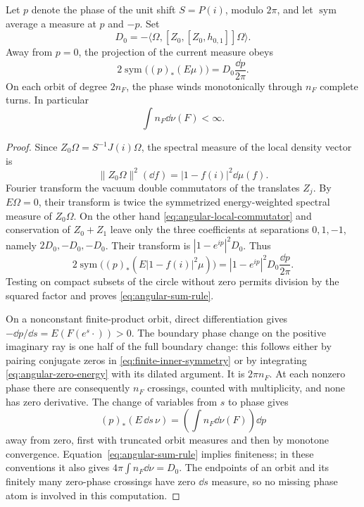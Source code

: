 \begin{lemma}\label{lem:sum-rule}
Let $p$ denote the phase of the unit shift $S=P(i)$, modulo $2\pi$, and
let $\operatorname{sym}$ average a measure at $p$ and $-p$.  Set
\[
 D_0=-\langle\Omega,[Z_0,[Z_0,h_{0,1}]]\Omega\rangle.
\]
Away from $p=0$, the projection of the current measure obeys
\begin{equation}\label{eq:angular-sum-rule}
 2\operatorname{sym}\bigl((p)_*(E\mu)\bigr)
       =D_0\frac{\dd p}{2\pi}.
\end{equation}
On each orbit of degree $2n_F$, the phase winds monotonically through
$n_F$ complete turns.  In particular
\begin{equation}\label{eq:angular-degree-integral}
 \int n_F\dd\nu(F)<\infty.
\end{equation}
\end{lemma}

\begin{proof}
Since $Z_0\Omega=S^{-1}J(i)\Omega$, the spectral measure of the local
density vector is
\begin{equation}\label{eq:angular-density-measure}
 \|Z_0\Omega\|^2(\dd f)=|1-f(i)|^2\dd\mu(f).
\end{equation}
Fourier transform the vacuum double commutators of the translates
$Z_j$.  By $E\Omega=0$, their transform is twice the symmetrized
energy-weighted spectral measure of $Z_0\Omega$.  On the other hand
\eqref{eq:angular-local-commutator} and conservation of
$Z_0+Z_1$ leave only the three coefficients at separations $0,1,-1$,
namely $2D_0,-D_0,-D_0$.  Their transform is
$|1-e^{ip}|^2D_0$.  Thus
\[
 2\operatorname{sym}\bigl((p)_*(E|1-f(i)|^2\mu)\bigr)
 =|1-e^{ip}|^2D_0\frac{\dd p}{2\pi}.
\]
Testing on compact subsets of the circle without zero permits division
by the squared factor and proves \eqref{eq:angular-sum-rule}.

On a nonconstant finite-product orbit, direct differentiation gives
$-\dd p/\dd s=E(F(e^s\cdot))>0$.  The boundary phase change on the
positive imaginary ray is one half of the full boundary change: this
follows either by pairing conjugate zeros in
\eqref{eq:finite-inner-symmetry} or by integrating
\eqref{eq:angular-zero-energy} with its dilated argument.  It is
$2\pi n_F$.  At each nonzero phase there are consequently $n_F$
crossings, counted with multiplicity, and none has zero derivative.
The change of variables from $s$ to phase gives
\[
 (p)_*(E\,\dd s\,\nu)=\left(\int n_F\dd\nu(F)\right)\dd p
\]
away from zero, first with truncated orbit measures and then by monotone
convergence.  Equation~\eqref{eq:angular-sum-rule} implies finiteness;
in these conventions it also gives
$4\pi\int n_F\dd\nu=D_0$.  The endpoints of an orbit and its finitely
many zero-phase crossings have zero $\dd s$ measure, so no missing
phase atom is involved in this computation.
\end{proof}

